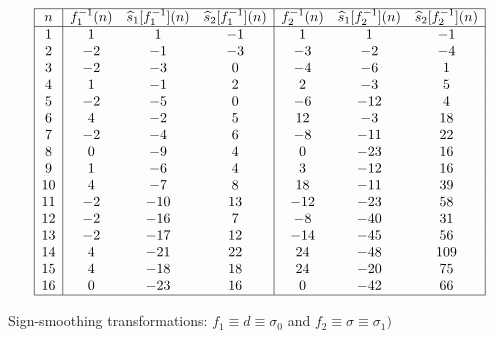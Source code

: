 \documentclass[12pt,reqno,a4letter]{article}
\numberwithin{figure}{section}
\numberwithin{table}{section}
\numberwithin{equation}{section}
\theoremstyle{plain}
\numberwithin{theorem}{section}
\theoremstyle{definition}
\begin{document}
\begin{table}[h!]
\begin{equation*}
\begin{array}{|c|ccc|ccc|} 
 \hline
 n & f_1^{-1}(n) & \widehat{s}_1[f_1^{-1}](n) & \widehat{s}_2[f_1^{-1}](n) & 
     f_2^{-1}(n) & \widehat{s}_1[f_2^{-1}](n) & 
     \widehat{s}_2[f_2^{-1}](n) \\ \hline
 1 & 1 & 1 & -1 & 1 & 1 & -1 \\
 2 & -2 & -1 & -3 & -3 & -2 & -4 \\
 3 & -2 & -3 & 0 & -4 & -6 & 1 \\
 4 & 1 & -1 & 2 & 2 & -3 & 5 \\
 5 & -2 & -5 & 0 & -6 & -12 & 4 \\
 6 & 4 & -2 & 5 & 12 & -3 & 18 \\
 7 & -2 & -4 & 6 & -8 & -11 & 22 \\
 8 & 0 & -9 & 4 & 0 & -23 & 16 \\
 9 & 1 & -6 & 4 & 3 & -12 & 16 \\
 10 & 4 & -7 & 8 & 18 & -11 & 39 \\
 11 & -2 & -10 & 13 & -12 & -23 & 58 \\
 12 & -2 & -16 & 7 & -8 & -40 & 31 \\
 13 & -2 & -17 & 12 & -14 & -45 & 56 \\
 14 & 4 & -21 & 22 & 24 & -48 & 109 \\
 15 & 4 & -18 & 18 & 24 & -20 & 75 \\
 16 & 0 & -23 & 16 & 0 & -42 & 66 \\
 \hline
\end{array}
\end{equation*}
\caption{Sign-smoothing transformations: $f_1 \equiv d \equiv \sigma_0$ and $f_2 \equiv \sigma \equiv \sigma_1)$}
\label{table_s12fn_SignSmoothingTF_v2}
\end{table}
\end{document}
